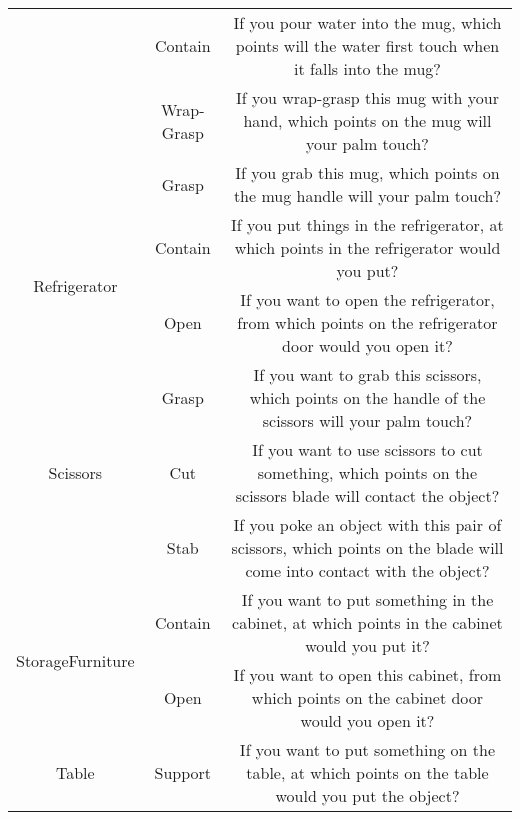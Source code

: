 \documentclass[final]{cvpr}
\begin{document}
\begin{table*}[t]
{\begin{tabular}{c|c|c}
                                      & Contain             & If you pour water into the mug, which points will the water first touch when it falls into the mug?                                              \\
                                      & Wrap-Grasp          & If you wrap-grasp this mug with your hand, which points on the mug will your palm touch?                                                         \\
                                      & Grasp               & If you grab this mug, which points on the mug handle will your palm touch?                                                                       \\ \hline
    \multirow{2}{*}{Refrigerator}     & Contain             & If you put things in the refrigerator, at which points in the refrigerator would you put?                                                        \\
                                      & Open                & If you want to open the refrigerator, from which points on the refrigerator door would you open it?                                              \\ \hline
    \multirow{3}{*}{Scissors}         & Grasp               & If you want to grab this scissors, which points on the handle of the scissors will your palm touch?                                              \\
                                      & Cut                 & If you want to use scissors to cut something, which points on the scissors blade will contact the object?                                        \\
                                      & Stab                & If you poke an object with this pair of scissors, which points on the blade will come into contact with the object?                              \\ \hline
    \multirow{2}{*}{StorageFurniture} & Contain             & If you want to put something in the cabinet, at which points in the cabinet would you put it?                                                    \\
                                      & Open                & If you want to open this cabinet, from which points on the cabinet door would you open it?                                                       \\ \hline
    \multirow{2}{*}{Table}            & Support             & If you want to put something on the table, at which points on the table would you put the object?                                                \\

\end{tabular}}
\end{table*}
\end{document}
